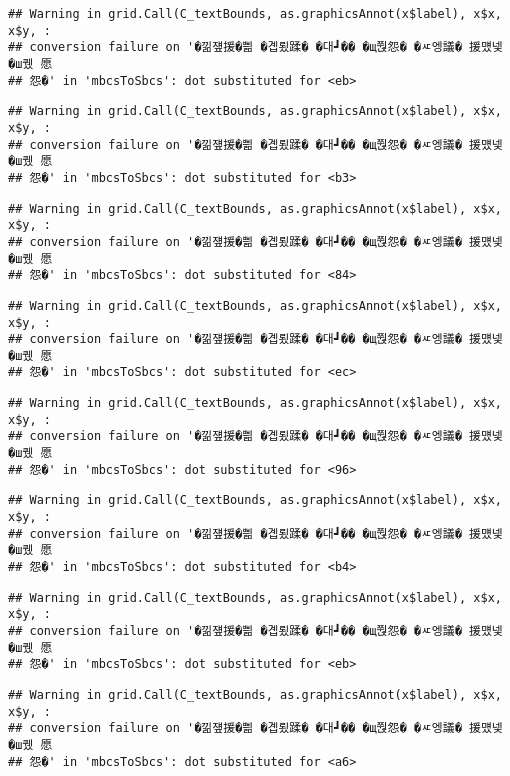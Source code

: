 \documentclass[
]{article}
\begin{document}
\begin{verbatim}
## Warning in grid.Call(C_textBounds, as.graphicsAnnot(x$label), x$x, x$y, :
## conversion failure on '�낆쟾援�쁾 �곕룄蹂� �대┛�� �щ쭩怨� �ㅼ엥議� 援먰넻�ш퀬 愿
## 怨�' in 'mbcsToSbcs': dot substituted for <eb>
\end{verbatim}

\begin{verbatim}
## Warning in grid.Call(C_textBounds, as.graphicsAnnot(x$label), x$x, x$y, :
## conversion failure on '�낆쟾援�쁾 �곕룄蹂� �대┛�� �щ쭩怨� �ㅼ엥議� 援먰넻�ш퀬 愿
## 怨�' in 'mbcsToSbcs': dot substituted for <b3>
\end{verbatim}

\begin{verbatim}
## Warning in grid.Call(C_textBounds, as.graphicsAnnot(x$label), x$x, x$y, :
## conversion failure on '�낆쟾援�쁾 �곕룄蹂� �대┛�� �щ쭩怨� �ㅼ엥議� 援먰넻�ш퀬 愿
## 怨�' in 'mbcsToSbcs': dot substituted for <84>
\end{verbatim}

\begin{verbatim}
## Warning in grid.Call(C_textBounds, as.graphicsAnnot(x$label), x$x, x$y, :
## conversion failure on '�낆쟾援�쁾 �곕룄蹂� �대┛�� �щ쭩怨� �ㅼ엥議� 援먰넻�ш퀬 愿
## 怨�' in 'mbcsToSbcs': dot substituted for <ec>
\end{verbatim}

\begin{verbatim}
## Warning in grid.Call(C_textBounds, as.graphicsAnnot(x$label), x$x, x$y, :
## conversion failure on '�낆쟾援�쁾 �곕룄蹂� �대┛�� �щ쭩怨� �ㅼ엥議� 援먰넻�ш퀬 愿
## 怨�' in 'mbcsToSbcs': dot substituted for <96>
\end{verbatim}

\begin{verbatim}
## Warning in grid.Call(C_textBounds, as.graphicsAnnot(x$label), x$x, x$y, :
## conversion failure on '�낆쟾援�쁾 �곕룄蹂� �대┛�� �щ쭩怨� �ㅼ엥議� 援먰넻�ш퀬 愿
## 怨�' in 'mbcsToSbcs': dot substituted for <b4>
\end{verbatim}

\begin{verbatim}
## Warning in grid.Call(C_textBounds, as.graphicsAnnot(x$label), x$x, x$y, :
## conversion failure on '�낆쟾援�쁾 �곕룄蹂� �대┛�� �щ쭩怨� �ㅼ엥議� 援먰넻�ш퀬 愿
## 怨�' in 'mbcsToSbcs': dot substituted for <eb>
\end{verbatim}

\begin{verbatim}
## Warning in grid.Call(C_textBounds, as.graphicsAnnot(x$label), x$x, x$y, :
## conversion failure on '�낆쟾援�쁾 �곕룄蹂� �대┛�� �щ쭩怨� �ㅼ엥議� 援먰넻�ш퀬 愿
## 怨�' in 'mbcsToSbcs': dot substituted for <a6>
\end{verbatim}
\end{document}
